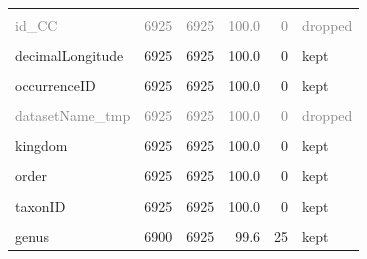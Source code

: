 \documentclass[sn-apa,pdflatex]{sn-jnl}
\begin{document}
\begin{longtable}[t]{lrrrrl}
\endfoot
\bottomrule
\endlastfoot
\cellcolor{gray!10}{prim\_key} & \cellcolor{gray!10}{6925} & \cellcolor{gray!10}{6925} & \cellcolor{gray!10}{100.0} & \cellcolor{gray!10}{0} & \cellcolor{gray!10}{kept}\\
\textcolor{gray}{id\_CC} & \textcolor{gray}{6925} & \textcolor{gray}{6925} & \textcolor{gray}{100.0} & \textcolor{gray}{0} & \textcolor{gray}{dropped}\\
\cellcolor{gray!10}{decimalLatitude} & \cellcolor{gray!10}{6925} & \cellcolor{gray!10}{6925} & \cellcolor{gray!10}{100.0} & \cellcolor{gray!10}{0} & \cellcolor{gray!10}{kept}\\
decimalLongitude & 6925 & 6925 & 100.0 & 0 & kept\\
\cellcolor{gray!10}{canonicalName} & \cellcolor{gray!10}{6925} & \cellcolor{gray!10}{6925} & \cellcolor{gray!10}{100.0} & \cellcolor{gray!10}{0} & \cellcolor{gray!10}{kept}\\
\addlinespace
occurrenceID & 6925 & 6925 & 100.0 & 0 & kept\\
\cellcolor{gray!10}{scientificName} & \cellcolor{gray!10}{6925} & \cellcolor{gray!10}{6925} & \cellcolor{gray!10}{100.0} & \cellcolor{gray!10}{0} & \cellcolor{gray!10}{kept}\\
\textcolor{gray}{datasetName\_tmp} & \textcolor{gray}{6925} & \textcolor{gray}{6925} & \textcolor{gray}{100.0} & \textcolor{gray}{0} & \textcolor{gray}{dropped}\\
\cellcolor{gray!10}{data\_source} & \cellcolor{gray!10}{6925} & \cellcolor{gray!10}{6925} & \cellcolor{gray!10}{100.0} & \cellcolor{gray!10}{0} & \cellcolor{gray!10}{kept}\\
kingdom & 6925 & 6925 & 100.0 & 0 & kept\\
\addlinespace
\cellcolor{gray!10}{phylum} & \cellcolor{gray!10}{6925} & \cellcolor{gray!10}{6925} & \cellcolor{gray!10}{100.0} & \cellcolor{gray!10}{0} & \cellcolor{gray!10}{kept}\\
order & 6925 & 6925 & 100.0 & 0 & kept\\
\cellcolor{gray!10}{taxonRank} & \cellcolor{gray!10}{6925} & \cellcolor{gray!10}{6925} & \cellcolor{gray!10}{100.0} & \cellcolor{gray!10}{0} & \cellcolor{gray!10}{kept}\\
taxonID & 6925 & 6925 & 100.0 & 0 & kept\\
\cellcolor{gray!10}{family} & \cellcolor{gray!10}{6924} & \cellcolor{gray!10}{6925} & \cellcolor{gray!10}{100.0} & \cellcolor{gray!10}{1} & \cellcolor{gray!10}{kept}\\
\addlinespace
genus & 6900 & 6925 & 99.6 & 25 & kept\\

\end{longtable}
\end{document}
